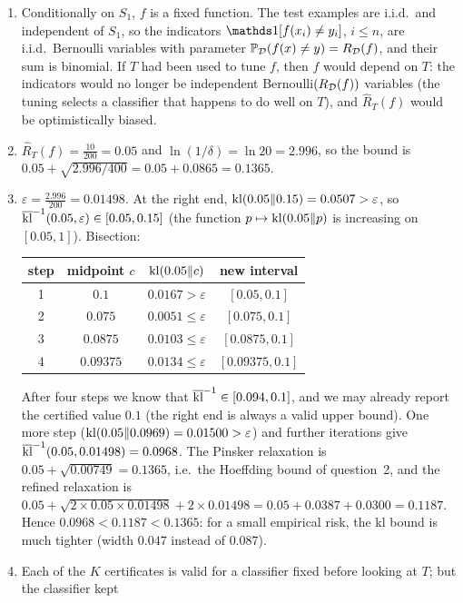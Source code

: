 \documentclass[11pt]{article}
\begin{document}
\begin{solution}
\begin{enumerate}
\item Conditionally on $S_1$, $f$ is a fixed function. The test examples are i.i.d.\ and independent of $S_1$, so the
      indicators $\ind{f(x_i)\neq y_i}$, $i\leq n$, are i.i.d.\ Bernoulli variables with parameter
      $\mathbb{P}_{\mathcal{D}}(f(x)\neq y)=R_{\mathcal{D}}(f)$, and their sum is binomial. If $T$ had been used to tune $f$, then $f$ would depend on
      $T$: the indicators would no longer be independent Bernoulli$(R_{\mathcal{D}}(f))$ variables (the tuning selects a
      classifier that happens to do well on $T$), and $\widehat R_T(f)$ would be optimistically biased.
\item $\widehat R_T(f)=\frac{10}{200}=0.05$ and $\ln(1/\delta)=\ln20=2.996$, so the bound is
      $0.05+\sqrt{2.996/400}=0.05+0.0865=0.1365$.
\item $\varepsilon=\frac{2.996}{200}=0.01498$. At the right end, $\operatorname{kl}(0.05\|0.15)=0.0507>\varepsilon$, so
      $\overline{\operatorname{kl}}^{-1}(0.05,\varepsilon)\in[0.05,0.15]$ (the function $p\mapsto\operatorname{kl}(0.05\|p)$ is increasing on $[0.05,1]$). Bisection:
      \begin{center}
      \begin{tabular}{cccc}\toprule
      step & midpoint $c$ & $\operatorname{kl}(0.05\|c)$ & new interval\\\midrule
      1 & $0.1$ & $0.0167>\varepsilon$ & $[0.05,0.1]$\\
      2 & $0.075$ & $0.0051\leq\varepsilon$ & $[0.075,0.1]$\\
      3 & $0.0875$ & $0.0103\leq\varepsilon$ & $[0.0875,0.1]$\\
      4 & $0.09375$ & $0.0134\leq\varepsilon$ & $[0.09375,0.1]$\\\bottomrule
      \end{tabular}
      \end{center}
      After four steps we know that $\overline{\operatorname{kl}}^{-1}\in[0.094,0.1]$, and we may already report the certified value $0.1$ (the
      right end is always a valid upper bound). One more step ($\operatorname{kl}(0.05\|0.0969)=0.01500>\varepsilon$) and further
      iterations give $\overline{\operatorname{kl}}^{-1}(0.05,0.01498)=0.0968$. The Pinsker relaxation is $0.05+\sqrt{0.00749}=0.1365$, i.e.\ the
      Hoeffding bound of question~2, and the refined relaxation is $0.05+\sqrt{2\times0.05\times0.01498}+2\times0.01498=0.05+0.0387+0.0300=0.1187$.
      Hence $0.0968<0.1187<0.1365$: for a small empirical risk, the kl bound is much tighter (width $0.047$ instead of $0.087$).
\item Each of the $K$ certificates is valid for a classifier fixed before looking at $T$; but the classifier kept

\end{enumerate}
\end{solution}
\end{document}
